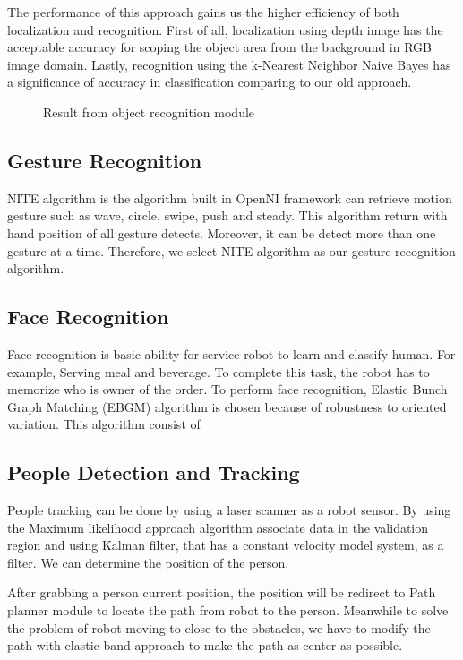 \documentclass{llncs}
\begin{document}
The performance of this approach gains us the higher efficiency of both localization and recognition. First of all, localization using depth image has the acceptable accuracy for scoping the object area from the background in RGB image domain. Lastly, recognition using the  k-Nearest Neighbor Naive Bayes has a significance of accuracy in classification comparing to our old approach. 

\begin{figure}
\centering
\caption{Result from object recognition module}
\label{fig:object_recog}
\end{figure}

\subsection{Gesture Recognition}

NITE algorithm is the algorithm built in OpenNI framework can retrieve motion gesture such as wave, circle, swipe, push and steady. This algorithm return with hand position of all gesture detects.
Moreover, it can be detect more than one gesture at a time. Therefore, we select NITE algorithm as our
gesture recognition algorithm.

\subsection{Face Recognition}

Face recognition is basic ability for service robot to learn and classify human. For example, Serving meal and beverage. To complete this task, the robot has to memorize who is owner of the order. To perform face recognition, Elastic Bunch Graph Matching (EBGM) algorithm is chosen because of robustness to oriented variation. This algorithm consist of 

\subsection{People Detection and Tracking}

People tracking can be done by using a laser scanner as a robot sensor. By using the Maximum likelihood approach algorithm associate data in the validation region and using Kalman filter, that has a constant velocity model system, as a filter. We can determine the position of the person.

After grabbing a person current position, the position will be redirect to Path planner module to locate the path from robot to the person. Meanwhile to solve the problem of robot moving to close to the obstacles, we have to modify the path with elastic band approach to make the path as center as possible.
\end{document}
